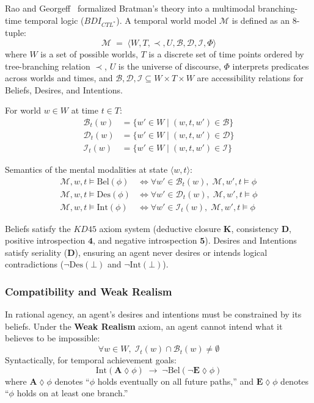 Rao and Georgeff~ formalized Bratman's theory into a multimodal branching-time temporal logic ($BDI_{CTL^*}$). A temporal world model $\mathcal{M}$ is defined as an 8-tuple:
\begin{equation}
\mathcal{M} \;=\; \langle W, T, \prec, U, \mathcal{B}, \mathcal{D}, \mathcal{I}, \Phi \rangle
\end{equation}
where $W$ is a set of possible worlds, $T$ is a discrete set of time points ordered by tree-branching relation $\prec$, $U$ is the universe of discourse, $\Phi$ interprets predicates across worlds and times, and $\mathcal{B}, \mathcal{D}, \mathcal{I} \subseteq W \times T \times W$ are accessibility relations for Beliefs, Desires, and Intentions.

For world $w \in W$ at time $t \in T$:
\begin{align}
\mathcal{B}_t(w) &= \{ w' \in W \mid (w, t, w') \in \mathcal{B} \} \\
\mathcal{D}_t(w) &= \{ w' \in W \mid (w, t, w') \in \mathcal{D} \} \\
\mathcal{I}_t(w) &= \{ w' \in W \mid (w, t, w') \in \mathcal{I} \}
\end{align}

Semantics of the mental modalities at state $\langle w, t \rangle$:
\begin{align}
\mathcal{M}, w, t \models \mathrm{Bel}(\phi) &\iff \forall w' \in \mathcal{B}_t(w), \; \mathcal{M}, w', t \models \phi \\
\mathcal{M}, w, t \models \mathrm{Des}(\phi) &\iff \forall w' \in \mathcal{D}_t(w), \; \mathcal{M}, w', t \models \phi \\
\mathcal{M}, w, t \models \mathrm{Int}(\phi) &\iff \forall w' \in \mathcal{I}_t(w), \; \mathcal{M}, w', t \models \phi
\end{align}

Beliefs satisfy the $KD45$ axiom system (deductive closure $\mathbf{K}$, consistency $\mathbf{D}$, positive introspection $\mathbf{4}$, and negative introspection $\mathbf{5}$). Desires and Intentions satisfy seriality ($\mathbf{D}$), ensuring an agent never desires or intends logical contradictions ($\neg\mathrm{Des}(\bot)$ and $\neg\mathrm{Int}(\bot)$).

\subsubsection{Compatibility and Weak Realism}
In rational agency, an agent's desires and intentions must be constrained by its beliefs. Under the \textbf{Weak Realism} axiom, an agent cannot intend what it believes to be impossible:
\begin{equation}
\forall w \in W, \; \mathcal{I}_t(w) \cap \mathcal{B}_t(w) \neq \emptyset
\end{equation}
Syntactically, for temporal achievement goals:
\begin{equation}
\mathrm{Int}(\mathbf{A}\lozenge \phi) \;\to\; \neg\mathrm{Bel}(\neg\mathbf{E}\lozenge \phi)
\end{equation}
where $\mathbf{A}\lozenge \phi$ denotes ``$\phi$ holds eventually on all future paths,'' and $\mathbf{E}\lozenge \phi$ denotes ``$\phi$ holds on at least one branch.''

